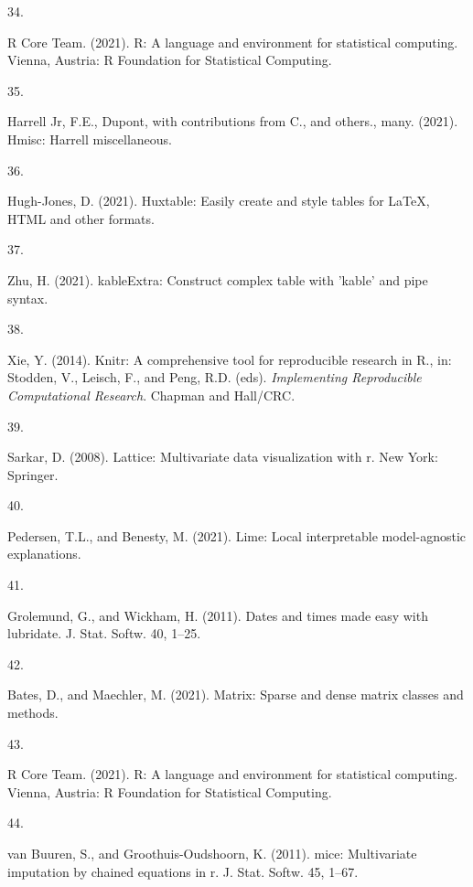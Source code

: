 \documentclass[
]{article}
\newlength{\cslhangindent}
\newlength{\csllabelwidth}
\newlength{\cslentryspacingunit} %
\newenvironment{CSLReferences}[2] %
 {%
  \setlength{\parindent}{0pt}
  \ifodd #1
  \let\oldpar\par
  \def\par{\hangindent=\cslhangindent\oldpar}
  \fi
  \setlength{\parskip}{#2\cslentryspacingunit}
 }%
 {}
\newcommand{\CSLLeftMargin}[1]{\parbox[t]{\csllabelwidth}{#1}}
\newcommand{\CSLRightInline}[1]{\parbox[t]{\linewidth - \csllabelwidth}{#1}\break}
\begin{document}
\begin{CSLReferences}{0}{0}
\leavevmode{}%
\CSLLeftMargin{34. }
\CSLRightInline{R Core Team. (2021). R: {A} language and environment for statistical computing. {Vienna, Austria}: {R Foundation for Statistical Computing}.}

\leavevmode{}%
\CSLLeftMargin{35. }
\CSLRightInline{Harrell Jr, F.E., Dupont, with contributions from C., and others., many. (2021). Hmisc: {Harrell} miscellaneous.}

\leavevmode{}%
\CSLLeftMargin{36. }
\CSLRightInline{Hugh-Jones, D. (2021). Huxtable: {Easily} create and style tables for {LaTeX}, {HTML} and other formats.}

\leavevmode{}%
\CSLLeftMargin{37. }
\CSLRightInline{Zhu, H. (2021). {kableExtra}: {Construct} complex table with 'kable' and pipe syntax.}

\leavevmode{}%
\CSLLeftMargin{38. }
\CSLRightInline{Xie, Y. (2014). Knitr: {A} comprehensive tool for reproducible research in {R}., in: Stodden, V., Leisch, F., and Peng, R.D. (eds). \emph{Implementing Reproducible Computational Research}. {Chapman and Hall/CRC}.}

\leavevmode{}%
\CSLLeftMargin{39. }
\CSLRightInline{Sarkar, D. (2008). Lattice: {Multivariate} data visualization with r. {New York}: {Springer}.}

\leavevmode{}%
\CSLLeftMargin{40. }
\CSLRightInline{Pedersen, T.L., and Benesty, M. (2021). Lime: {Local} interpretable model-agnostic explanations.}

\leavevmode{}%
\CSLLeftMargin{41. }
\CSLRightInline{Grolemund, G., and Wickham, H. (2011). Dates and times made easy with {lubridate}. J. Stat. Softw. 40, 1--25.}

\leavevmode{}%
\CSLLeftMargin{42. }
\CSLRightInline{Bates, D., and Maechler, M. (2021). Matrix: {Sparse} and dense matrix classes and methods.}

\leavevmode{}%
\CSLLeftMargin{43. }
\CSLRightInline{R Core Team. (2021). R: {A} language and environment for statistical computing. {Vienna, Austria}: {R Foundation for Statistical Computing}.}

\leavevmode{}%
\CSLLeftMargin{44. }
\CSLRightInline{van Buuren, S., and Groothuis-Oudshoorn, K. (2011). {mice}: {Multivariate} imputation by chained equations in r. J. Stat. Softw. 45, 1--67.}


\end{CSLReferences}
\end{document}
